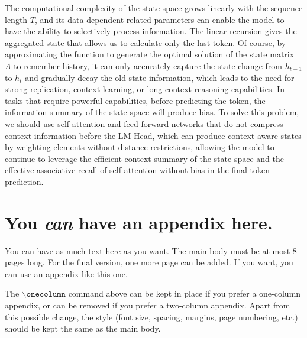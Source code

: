 \documentclass{article}
\theoremstyle{plain}
\theoremstyle{definition}
\theoremstyle{remark}
\begin{document}
The computational complexity of the state space grows linearly with the sequence length $T$, and its data-dependent related parameters can enable the model to have the ability to selectively process information. The linear recursion gives the aggregated state that allows us to calculate only the last token. Of course, by approximating the function to generate the optimal solution of the state matrix $A$ to remember history, it can only accurately capture the state change from $h_{t-1}$ to $h_t$ and gradually decay the old state information, which leads to the need for strong replication, context learning, or long-context reasoning capabilities. In tasks that require powerful capabilities, before predicting the token, the information summary of the state space will produce bias. To solve this problem, we should use self-attention and feed-forward networks that do not compress context information before the LM-Head, which can produce context-aware states by weighting elements without distance restrictions, allowing the model to continue to leverage the efficient context summary of the state space and the effective associative recall of self-attention without bias in the final token prediction.






\newpage
\appendix
\onecolumn
\section{You \emph{can} have an appendix here.}

You can have as much text here as you want. The main body must be at most $8$ pages long.
For the final version, one more page can be added.
If you want, you can use an appendix like this one.  

The $\mathtt{\backslash onecolumn}$ command above can be kept in place if you prefer a one-column appendix, or can be removed if you prefer a two-column appendix.  Apart from this possible change, the style (font size, spacing, margins, page numbering, etc.) should be kept the same as the main body.
\end{document}

